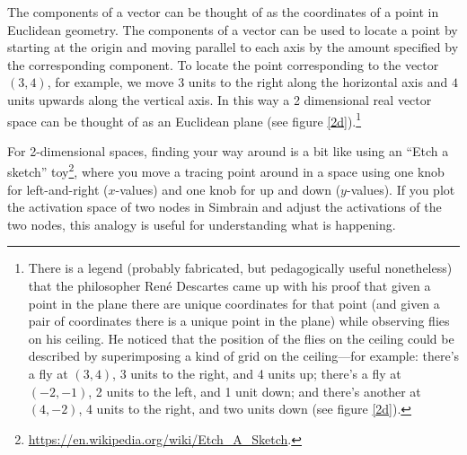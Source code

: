    The components of a vector can be thought of as the coordinates of a point
in Euclidean geometry. The components of a vector can be used to locate a
point by starting at the origin and moving parallel to each axis by the 
amount specified by the corresponding component. To locate the point corresponding to the vector 
$(3,4)$, for example, we move $3$ units to the right along the 
horizontal axis and $4$ units upwards along the vertical axis. In this way a 
2 dimensional real vector space can be thought of as an Euclidean plane (see 
figure \ref{2d}).\footnote{There is a legend (probably fabricated, but pedagogically useful nonetheless) 
that the philosopher Ren{\'{e}} Descartes 
 came up with his proof that given a point in the plane there are unique coordinates for that 
 point (and given a pair of coordinates there is a unique point in the plane) 
 while observing flies on his ceiling. He 
 noticed that the position of the flies on the ceiling could be described by 
 superimposing a kind of grid on the ceiling---for example: there's a fly at 
 $(3,4)$, 3 units to the right, and 4 units up; there's a fly at 
 $(-2,-1)$, 2 units to the left, and 1 unit down; and there's another at 
 $(4,-2)$, 4 units to the right, and two units down (see figure \ref{2d}).} 
 
For 2-dimensional spaces, finding your way around is a bit like using an ``Etch a sketch'' toy\footnote{\url{https://en.wikipedia.org/wiki/Etch_A_Sketch}.}, where you move a tracing point around in a space using one knob for left-and-right ($x$-values) and one knob for up and down ($y$-values). If you plot the activation space of two nodes in Simbrain and adjust the activations of the two nodes, this analogy is useful for understanding what is happening.

